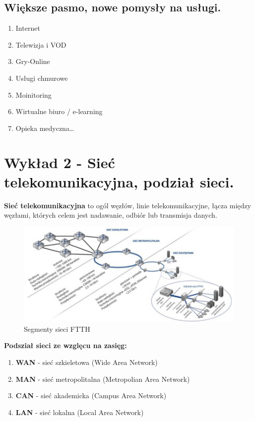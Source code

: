\documentclass{article}
\begin{document}
\subsection{Większe pasmo, nowe pomysły na usługi. }
\begin{enumerate}
  \item Internet
  \item Telewizja i VOD
  \item Gry-Online
  \item Usługi chmurowe
  \item Moinitoring
  \item Wirtualne biuro / e-learning
  \item Opieka medyczna\ldots
\end{enumerate}
\section{Wykład 2 - Sieć telekomunikacyjna, podział sieci.}
\textbf{Sieć telekomunikacyjna} to ogól węzłów, linie telekomunikacyjne, łącza między węzłami, których celem jest nadawanie, odbiór lub transmisja danych.
\begin{figure}[h!]
    \centering
    \includegraphics[width=0.7\linewidth]{w02z01.jpg}
    \caption{Segmenty sieci FTTH}
    \end{figure}
\textbf{Podsział sieci ze wzglęcu na zasięg:}
\begin{enumerate}
    \item \textbf{WAN} - sieć szkieletowa (Wide Area Network)
    \item \textbf{MAN} - sieć metropolitalna (Metropolian Area Network)
    \item \textbf{CAN} - sieć akademicka (Campus Area Network)
    \item \textbf{LAN} - sieć lokalna (Local Area Network)
\end{enumerate}
\end{document}
